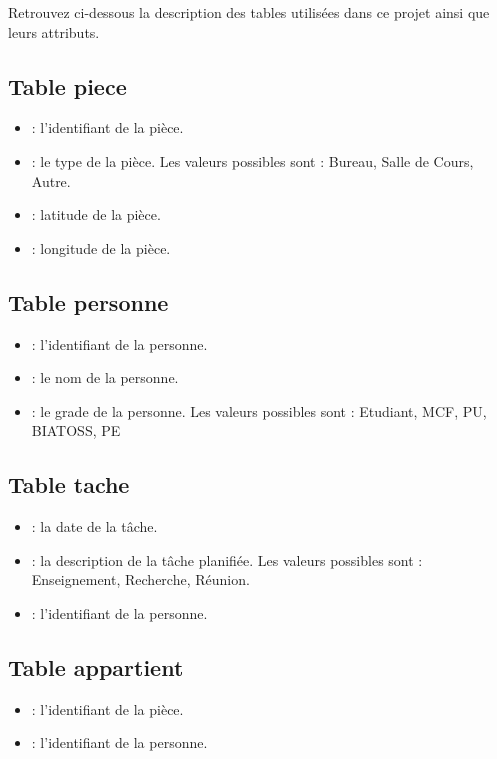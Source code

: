 Retrouvez ci-dessous la description des tables utilisées dans ce projet ainsi que leurs attributs.

\subsection{Table piece}
\begin{itemize}
	\item {} : l'identifiant de la pièce.
	\item {} : le type de la pièce. Les valeurs possibles sont : Bureau, Salle de Cours, Autre.
	\item {} : latitude de la pièce.
	\item {} : longitude de la pièce.
\end{itemize}

\subsection{Table personne}
\begin{itemize}
	\item {} : l'identifiant de la personne.
	\item {} : le nom de la personne.
	\item {} : le grade de la personne. Les valeurs possibles sont : Etudiant, MCF, PU, BIATOSS, PE
\end{itemize}

\subsection{Table tache}
\begin{itemize}
	\item {} : la date de la tâche.
	\item {} : la description de la tâche planifiée. Les valeurs possibles sont : Enseignement, Recherche, Réunion.
	\item {} : l'identifiant de la personne.
\end{itemize}

\subsection{Table appartient}
\begin{itemize}
	\item {} : l'identifiant de la pièce.
	\item {} : l'identifiant de la personne.
\end{itemize}

